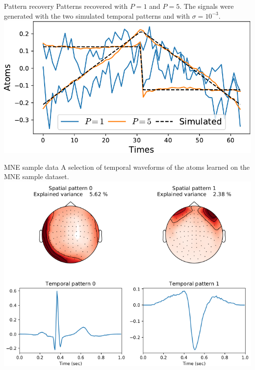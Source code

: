 \documentclass{beamer}
\begin{document}
\begin{frame}{Pattern recovery}
Patterns recovered with $P = 1$ and $P=5$. The signals were generated with the two simulated temporal patterns and with  $\sigma = 10^{-3}$. \\[1em]
\includegraphics[width=\textwidth]{1D_vs_multi_uv_hat_P5.pdf}
\end{frame}



\begin{frame}{MNE sample data}
A selection of temporal waveforms of the atoms learned on the MNE sample dataset.\\[1em]
\centering
\includegraphics[height=0.7\textheight]{artifacts}
\end{frame}
\end{document}
